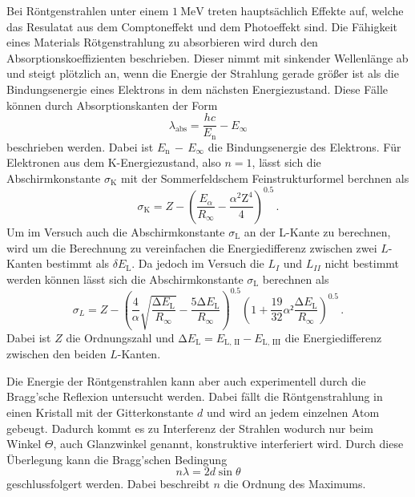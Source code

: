 \noindent
Bei Röntgenstrahlen unter einem $\SI{1}{\mega\electronvolt}$ treten hauptsächlich Effekte auf, welche das Resulatat aus dem Comptoneffekt und dem Photoeffekt sind. Die Fähigkeit eines 
Materials Rötgenstrahlung zu absorbieren wird durch den Absorptionskoeffizienten beschrieben. Dieser nimmt mit sinkender Wellenlänge ab und steigt plötzlich an, wenn die 
Energie der Strahlung gerade größer ist als die Bindungsenergie eines Elektrons in dem nächsten Energiezustand. Diese Fälle können durch Absorptionskanten der Form
\begin{equation}
    \lambda_\text{abs} = \frac{h c}{E_\text{n}} - E_\infty
\end{equation}
beschrieben werden. Dabei ist $E_\text{n} \, - \, E_\infty$ die Bindungsenergie des Elektrons. Für Elektronen aus dem K-Energiezustand, also $n=1$, lässt sich die Abschirmkonstante 
$\sigma_\text{K}$ mit der Sommerfeldschem Feinstrukturformel berchnen als
\begin{equation}
    \sigma_\text{K} = Z - \left(\frac{E_\alpha}{R_\infty} - \frac{\alpha^2 \text{Z}^4}{4}\right)^{0.5} \, .
    \label{eqn:sigmaK}
\end{equation}
\noindent
Um im Versuch auch die Abschirmkonstante $\sigma_\text{L}$ an der L-Kante zu berechnen, wird um die Berechnung zu vereinfachen die Energiedifferenz zwischen zwei $L$-Kanten bestimmt als
$\delta E_\text{L}$. Da jedoch im Versuch die $L_I$ und $L_{II}$ nicht bestimmt werden können lässt sich die Abschirmkonstante $\sigma_\text{L}$ berechnen als 
\begin{equation}
    \sigma_L = Z - \left(\frac{4}{\alpha} \sqrt{ \frac{\increment E_\text{L}}{R_\infty}} - \frac{5 \increment E_\text{L}}{R_\infty}\right)^{0.5} \left(1 + \frac{19}{32} \alpha² \frac{\increment E_\text{L}}{R_\infty}\right)^{0.5} \, .
\label{eqn:Ligma}
\end{equation}
\noindent
Dabei ist $Z$ die Ordnungszahl und $\increment E_\text{L} = E_{\text{L, II}} - E_{\text{L, III}}$ die Energiedifferenz zwischen den beiden $L$-Kanten.

\noindent
Die Energie der Röntgenstrahlen kann aber auch experimentell durch die Bragg'sche Reflexion untersucht werden. Dabei fällt die Röntgenstrahlung in einen Kristall mit der Gitterkonstante $d$ und wird an jedem einzelnen
Atom gebeugt. Dadurch kommt es zu Interferenz der Strahlen wodurch nur beim Winkel $\Theta$, auch Glanzwinkel genannt, konstruktive interferiert wird. Durch diese Überlegung kann die Bragg'schen Bedingung 
\begin{equation}
  n \lambda = 2 d \sin{\theta}
\label{eqn:bragg}
\end{equation}
\noindent
geschlussfolgert werden. Dabei beschreibt $n$ die Ordnung des Maximums.



